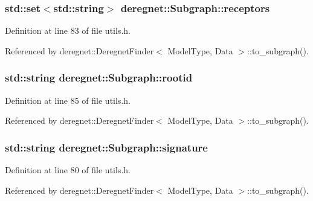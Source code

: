\subsubsection[{\texorpdfstring{receptors}{receptors}}]{\setlength{\rightskip}{0pt plus 5cm}std\+::set$<$std\+::string$>$ deregnet\+::\+Subgraph\+::receptors}\hypertarget{structderegnet_1_1Subgraph_a2a818ffe02ceced905ef38cb9a5253df}{}\label{structderegnet_1_1Subgraph_a2a818ffe02ceced905ef38cb9a5253df}


Definition at line 83 of file utils.\+h.



Referenced by deregnet\+::\+Deregnet\+Finder$<$ Model\+Type, Data $>$\+::to\+\_\+subgraph().

\subsubsection[{\texorpdfstring{rootid}{rootid}}]{\setlength{\rightskip}{0pt plus 5cm}std\+::string deregnet\+::\+Subgraph\+::rootid}\hypertarget{structderegnet_1_1Subgraph_a0e214a14649dcd35959c619cbdd9ce2b}{}\label{structderegnet_1_1Subgraph_a0e214a14649dcd35959c619cbdd9ce2b}


Definition at line 85 of file utils.\+h.



Referenced by deregnet\+::\+Deregnet\+Finder$<$ Model\+Type, Data $>$\+::to\+\_\+subgraph().

\subsubsection[{\texorpdfstring{signature}{signature}}]{\setlength{\rightskip}{0pt plus 5cm}std\+::string deregnet\+::\+Subgraph\+::signature}\hypertarget{structderegnet_1_1Subgraph_aae642b8b0b71de5539218040b0d7e201}{}\label{structderegnet_1_1Subgraph_aae642b8b0b71de5539218040b0d7e201}


Definition at line 80 of file utils.\+h.



Referenced by deregnet\+::\+Deregnet\+Finder$<$ Model\+Type, Data $>$\+::to\+\_\+subgraph().

